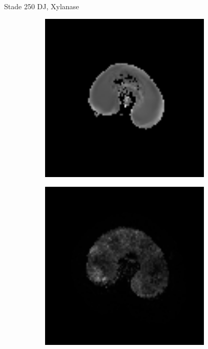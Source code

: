 \documentclass[10pt]{beamer}
\begin{document}
\begin{frame}{Stade 250 DJ, Xylanase}
    \begin{figure}[ht]
    \centering
    \begin{subfigure}[t]{0.33\textwidth}
      \centering
      \includegraphics[width=0.9\textwidth]{fig/stats_250Xyl_t2_irm}
    \end{subfigure}%
    \begin{subfigure}[t]{0.33\textwidth}
      \centering
      \includegraphics[width=0.9\textwidth]{fig/stats_250Xyl_t2}
    \end{subfigure}%
    
  \end{figure}

  
\end{frame}
\end{document}
